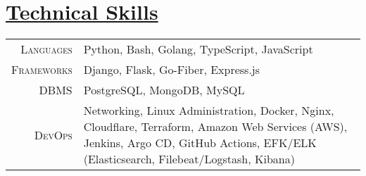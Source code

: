 \documentclass[a4paper,10pt]{extarticle} %
\begin{document}
 \vspace{+0.4cm} \section{\textcolor{primary}{\href{https://www.github.com/proffapt/bodhitree}{Technical Skills}}}

 \vspace{+0.2cm}

 \begin{tabular}{r|p{15cm}}
 \textsc{Languages} & Python, Bash, Golang, TypeScript, JavaScript \\
 \textsc{Frameworks} & Django, Flask, Go-Fiber, Express.js  \\
 \textsc{DBMS} & PostgreSQL, MongoDB, MySQL \\
 \textsc{DevOps} & Networking, Linux Administration, Docker, Nginx, Cloudflare, Terraform, Amazon Web Services (AWS), Jenkins, Argo CD, GitHub Actions, EFK/ELK (Elasticsearch, Filebeat/Logstash, Kibana)  \\
 
\end{tabular}
\end{document}
